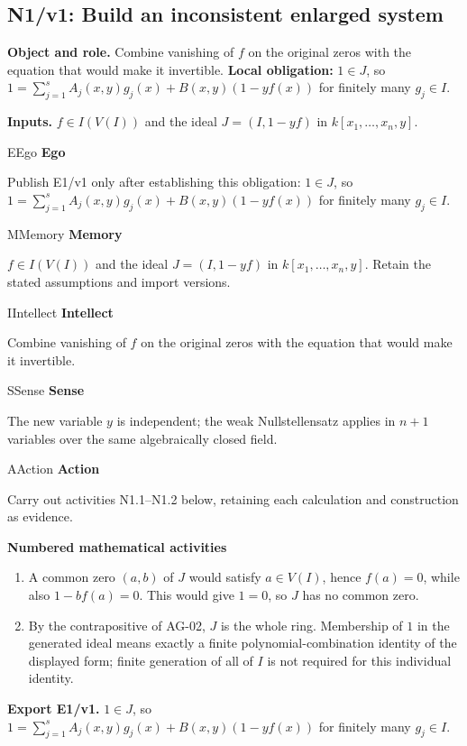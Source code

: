 \documentclass[preprint,12pt,aps,pra,showkeys,amsmath,amssymb,superscriptaddress,floatfix]{revtex4-2}
\theoremstyle{definition}
\theoremstyle{remark}
\newcommand{\mmfaculty}[3]{%
 \begin{mmfacultybox}{#1}{#2}
 {\sffamily\bfseries\color{MMBlue}#2}\par\smallskip #3
 \end{mmfacultybox}}
\newcommand{\field}[2]{\par\smallskip\noindent\textbf{#1.} #2\par}
\begin{document}
\subsection{N1/v1: Build an inconsistent enlarged system}

\field{Object and role}{Combine vanishing of \(f\) on the original zeros with the equation that
would make it invertible. \textbf{Local obligation:} \(1\in J\), so
\(1=\sum_{j=1}^s A_j(x,y)g_j(x)+B(x,y)(1-yf(x))\) for finitely many
\(g_j\in I\).}

\field{Inputs}{\(f\in I(V(I))\) and the ideal \(J=(I,1-yf)\) in
\(k[x_1,\ldots,x_n,y]\).}

\mmfaculty{E}{Ego}{Publish E1/v1 only after establishing this obligation: \(1\in J\), so
\(1=\sum_{j=1}^s A_j(x,y)g_j(x)+B(x,y)(1-yf(x))\) for finitely many
\(g_j\in I\).}

\mmfaculty{M}{Memory}{\(f\in I(V(I))\) and the ideal \(J=(I,1-yf)\) in
\(k[x_1,\ldots,x_n,y]\). Retain the stated assumptions and import
versions.}

\mmfaculty{I}{Intellect}{Combine vanishing of \(f\) on the original zeros with the equation that
would make it invertible.}

\mmfaculty{S}{Sense}{The new variable \(y\) is independent; the weak Nullstellensatz applies
in \(n+1\) variables over the same algebraically closed field.}

\mmfaculty{A}{Action}{Carry out activities N1.1--N1.2 below, retaining each calculation and
construction as evidence.}

\smallskip\noindent\textbf{Numbered mathematical activities}

\begin{enumerate}[label=N1.\arabic*,leftmargin=3.4em]

\item A common zero \((a,b)\) of \(J\) would satisfy \(a\in V(I)\), hence
\(f(a)=0\), while also \(1-bf(a)=0\). This would give \(1=0\), so \(J\)
has no common zero.

\item By the contrapositive of AG-02, \(J\) is the whole ring. Membership of
\(1\) in the generated ideal means exactly a finite
polynomial-combination identity of the displayed form; finite generation
of all of \(I\) is not required for this individual identity.

\end{enumerate}

\field{Export E1/v1}{\(1\in J\), so \(1=\sum_{j=1}^s A_j(x,y)g_j(x)+B(x,y)(1-yf(x))\) for
finitely many \(g_j\in I\).}
\end{document}
